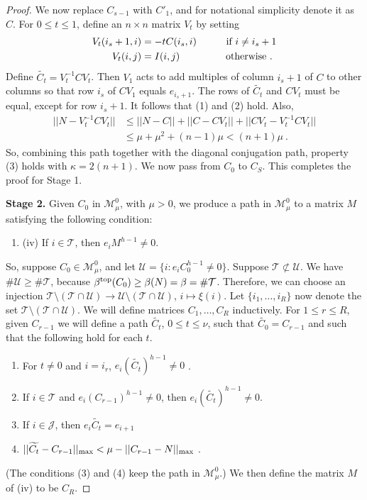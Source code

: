 \documentclass{amsart}
\theoremstyle{definition}
\theoremstyle{remark}
\numberwithin{equation}{section}
\begin{document}
{{\begin{proof}
We now replace $C_{s-1}$ with $C'_1$, and for notational simplicity denote it 
as $C$.  
For $0\leq t\leq 1$, define an $n\times n$ matrix 
$V_t$ by setting 
\begin{align*} 
V_t(i_s+1,i) & = -tC(i_s,i) \quad \qquad \textnormal{if } i\neq i_s+1 \\ 
V_t(i,j) &= I(i,j) \ \  \qquad  \qquad \textnormal{otherwise }. 
\end{align*} 
Define $\widetilde{C_t}=V_t^{-1}CV_t$. 
Then $V_1$ acts to add multiples of column $i_{s}+1 $ of $C$ to other columns so that 
row $i_s$ of $CV_1$ equals $e_{i_s+1}$. 
The rows of $\widetilde{C_t}$ and $CV_t$ must be equal, except for row $i_s+1$. It 
follows that (1) and (2) hold. 
Also, 
\begin{align*} 
||N-V_t^{-1}CV_t || & \leq
||N-C || + 
||C-CV_t || + 
||CV_t -V_t^{-1}CV_t || \\ 
&\leq \mu + \mu^2 + (n-1)\mu < (n+1)\mu \ . 
\end{align*}  
So, combining this path together with the
diagonal conjugation path, property (3) holds with $\kappa = 2(n+1)$. 
We now pass from $C_0$ to $C_S$. This completes the proof 
for Stage 1.


{\bf Stage 2.} Given $C_0$ in 
$\mathcal M_{\mu}^0$, with $\mu>0$,
we produce 
a path in $\mathcal M_{\mu}^0$  to a matrix $M$  satisfying the following 
condition: 
\begin{enumerate}
\item[]
(iv) If $ i\in \mathcal T$, then  
$e_iM^{h-1}\neq 0$. 
\end{enumerate} 

So, suppose $C_0\in \mathcal M^0_{\mu}$, and  
let $\mathcal U=\{i: e_iC_0^{h-1}\neq 0\}$.
Suppose $\mathcal T \not\subset\mathcal U $. 
We have $\# \mathcal U \geq \# \mathcal T $, because 
$\beta^{\textnormal{top}}(C_0)\geq \beta (N) = \beta= \# \mathcal T$.
Therefore, we can choose an injection 
$\mathcal T \setminus (\mathcal T \cap \mathcal U)\to 
\mathcal U \setminus (\mathcal T \cap \mathcal U)$, $i\mapsto \xi (i)$. 
Let  $\{i_1, \dots , i_R\}$ now denote the set 
$\mathcal T \setminus (\mathcal T \cap \mathcal U)$.
We will define matrices $C_1, \dots , C_R$ inductively. 
For $1\leq r \leq R$, given $C_{r-1}$ 
we will
define  a path $\widetilde{C_t}$, $0\leq t \leq \nu$, such that 
$\widetilde{C_0}=C_{r-1}$ and 
such that the following hold for each $t$. 
\begin{enumerate} 
\item For $t\neq 0$ and $i=i_r$,  $e_i(\widetilde{C_t})^{h-1} \neq 0$ . 
\item 
If $i \in \mathcal T$ 
and $e_i(C_{r-1})^{h-1} \neq 0$, then 
$e_i(\widetilde{C_t})^{h-1} \neq 0$. 
\item 
If $i\in \mathcal J$, then $e_i\widetilde{C_t}=e_{i+1}$
\item 
$||\widetilde{C_t} -C_{r-1}||_{\textnormal{max}} < \mu - 
||C_{r-1}-N||_{\textnormal{max}}$ . 
\end{enumerate} 
(The conditions (3) and (4) keep the path in 
$\mathcal M^0_{\mu}$.)  
We then define the matrix $M$ of (iv) to be $C_R$. 


\end{proof}}}
\end{document}

